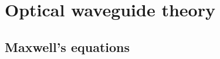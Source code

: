 \documentclass[../report.tex]{subfiles}
\begin{document}
	
	
\chapter{Optical waveguide theory}
		
	\section{Maxwell's equations}
	
\end{document}
